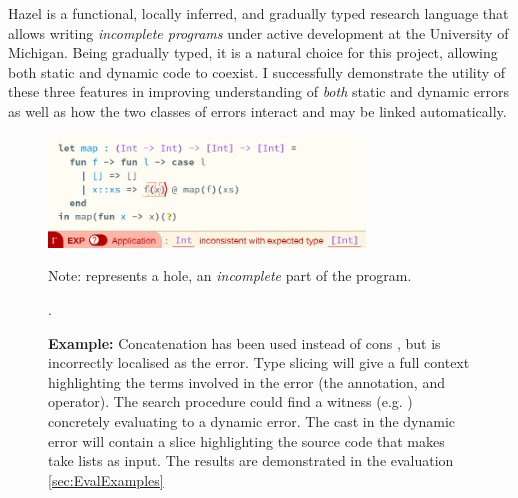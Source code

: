 Hazel \cite{Hazel} is a functional, locally inferred, and gradually typed research language that allows writing \textit{incomplete programs} under active development at the University of Michigan. Being gradually typed, it is a natural choice for this project, allowing both static and dynamic code to coexist. I successfully demonstrate the utility of these three features in improving understanding of \textit{both} static and dynamic errors as well as how the two classes of errors interact and may be linked automatically.



\begin{figure}
\centering
\includegraphics[width=0.75\textwidth]{Media/Figures/map_example_intro}

Note:  represents a hole, an \textit{incomplete} part of the program.
\caption{\textbf{Example:} Concatenation  has been used instead of cons \code{::}, but  is incorrectly localised as the error. Type slicing will give a full context highlighting the terms involved in the error (the annotation,  and  operator). The search procedure could find a witness (e.g. \code{[0]}) concretely evaluating to a dynamic error. The cast in the dynamic error will contain a slice highlighting the source code that makes  take lists as input. The results are demonstrated in the evaluation \cref{sec:EvalExamples}}.
\end{figure}


